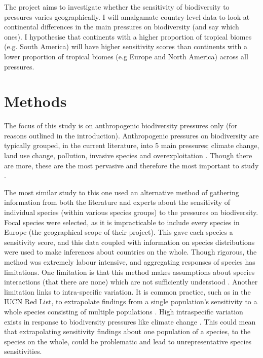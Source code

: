 \documentclass[11pt, a4paper, titlepage]{article}
\begin{document}
 	The project aims to investigate whether the sensitivity of biodiversity to pressures varies geographically. I will amalgamate country-level data to look at continental differences in the main pressures on biodiversity (and say which ones). I hypothesise that continents with a higher proportion of tropical biomes (e.g. South America) will have higher sensitivity scores than continents with a lower proportion of tropical biomes (e.g Europe and North America) across all pressures.  \newpage
 	
    \section*{Methods}

	The focus of this study is on anthropogenic biodiversity pressures only (for reasons outlined in the introduction). Anthropogenic pressures on biodiversity are typically grouped, in the current literature, into 5 main pressures; climate change, land use change, pollution, invasive species and overexploitation \citep{watson2019summary}. Though there are more, these are the most pervasive and therefore the most important to study \citep{mazor2018global}. 
	
	The most similar study to this one \citep{louette2010bioscore} used an alternative method of gathering information from both the literature and experts about the sensitivity of individual species (within various species groups) to the pressures on biodiversity. Focal species were selected, as it is impracticable to include every species in Europe (the geographical scope of their project). This gave each species a sensitivity score, and this data coupled with information on species distributions were used to make inferences about countries on the whole. 
	Though rigorous, the \cite{louette2010bioscore} method was extremely labour intensive, and aggregating responses of species has limitations. One limitation is that this method makes assumptions about species interactions (that there are none) which are not sufficiently understood \citep{hansen2001global}. Another limitation links to intra-specific variation. It is common practice, such as in the IUCN Red List, to extrapolate findings from a single population's sensitivity to a whole species consisting of multiple populations \citep{iucn2001iucn} \citep{buckley2012functional}. High intraspecific variation exists in response to biodiversity pressures like climate change \citep{mclean2018high} \citep{both2004large} \citep{mayor2016assessing}. This could mean that extrapolating sensitivity findings about one population of a species, to the species on the whole, could be problematic and lead to unrepresentative species sensitivities.
	
\end{document}
